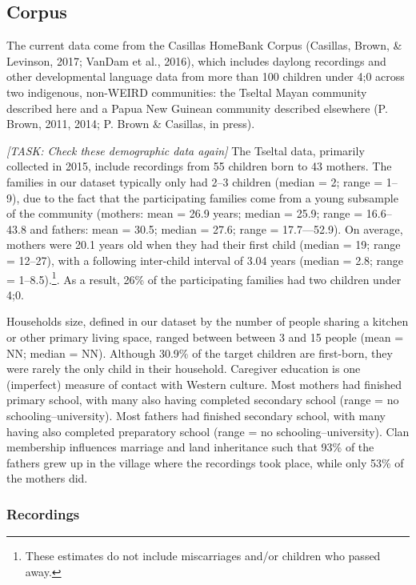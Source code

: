 \documentclass[floatsintext,man]{apa6}
\theoremstyle{definition}
\theoremstyle{definition}
\theoremstyle{definition}
\theoremstyle{remark}
\begin{document}
\subsection{Corpus}\label{methods-corpus}

The current data come from the Casillas HomeBank Corpus (Casillas,
Brown, \& Levinson, 2017; VanDam et al., 2016), which includes daylong
recordings and other developmental language data from more than 100
children under 4;0 across two indigenous, non-WEIRD communities: the
Tseltal Mayan community described here and a Papua New Guinean community
described elsewhere (P. Brown, 2011, 2014; P. Brown \& Casillas, in
press).

\emph{{[}TASK: Check these demographic data again{]}} The Tseltal data,
primarily collected in 2015, include recordings from 55 children born to
43 mothers. The families in our dataset typically only had 2--3 children
(median = 2; range = 1--9), due to the fact that the participating
families come from a young subsample of the community (mothers: mean =
26.9 years; median = 25.9; range = 16.6--43.8 and fathers: mean = 30.5;
median = 27.6; range = 17.7---52.9). On average, mothers were 20.1 years
old when they had their first child (median = 19; range = 12--27), with
a following inter-child interval of 3.04 years (median = 2.8; range =
1--8.5).\footnote{These estimates do not include miscarriages and/or children who passed away.}.
As a result, 26\% of the participating families had two children under
4;0.

Households size, defined in our dataset by the number of people sharing
a kitchen or other primary living space, ranged between between 3 and 15
people (mean = NN; median = NN). Although 30.9\% of the target children
are first-born, they were rarely the only child in their household.
Caregiver education is one (imperfect) measure of contact with Western
culture. Most mothers had finished primary school, with many also having
completed secondary school (range = no schooling--university). Most
fathers had finished secondary school, with many having also completed
preparatory school (range = no schooling--university). Clan membership
influences marriage and land inheritance such that 93\% of the fathers
grew up in the village where the recordings took place, while only 53\%
of the mothers did.

\subsubsection{Recordings}\label{methods-corpus-recs}
\end{document}
